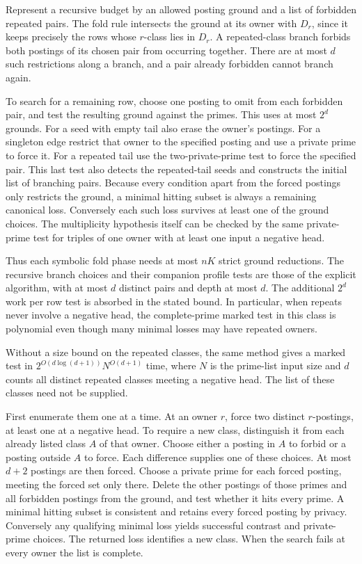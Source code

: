 Represent a recursive budget by an allowed posting
ground and a list of forbidden repeated pairs. The
fold rule intersects the ground at its owner with
$D_r$, since it keeps precisely the rows whose
$r$-class lies in $D_r$. A repeated-class branch
forbids both postings of its chosen pair from
occurring together. There are at most $d$ such
restrictions along a branch, and a pair already
forbidden cannot branch again.

To search for a remaining row, choose one posting
to omit from each forbidden pair, and test the
resulting ground against the primes. This uses
at most $2^d$ grounds. For a seed with empty tail
also erase the owner's postings. For a singleton
edge restrict that owner to the specified posting
and use a private prime to force it. For a repeated
tail use the two-private-prime test to force the
specified pair. This last test also detects the
repeated-tail seeds and constructs the initial
list of branching pairs. Because every condition
apart from the forced postings only restricts the
ground, a minimal hitting subset is always a
remaining canonical loss. Conversely each such
loss survives at least one of the ground choices.
The multiplicity hypothesis itself can be checked
by the same private-prime test for triples of one
owner with at least one input a negative head.

Thus each symbolic fold phase needs at most $nK$
strict ground reductions. The recursive branch
choices and their companion profile tests are
those of the explicit algorithm, with at most $d$
distinct pairs and depth at most $d$. The additional
$2^d$ work per row test is absorbed in the stated
bound. In particular, when repeats never involve
a negative head, the complete-prime marked test
in this class is polynomial even though many
minimal losses may have repeated owners.

Without a size bound on the repeated classes, the
same method gives a marked test in
$2^{O(d\log(d+1))}N^{O(d+1)}$ time, where $N$ is the
prime-list input size and $d$ counts all distinct
repeated classes meeting a negative head. The list
of these classes need not be supplied.

First enumerate them one at a time. At an owner $r$,
force two distinct $r$-postings, at least one at a
negative head. To require a new class, distinguish it
from each already listed class $A$ of that owner.
Choose either a posting in $A$ to forbid or a posting
outside $A$ to force. Each difference supplies one of
these choices. At most $d+2$ postings are then forced.
Choose a private prime for each forced posting,
meeting the forced set only there. Delete the other
postings of those primes and all forbidden postings
from the ground, and test whether it hits every
prime. A minimal hitting subset is consistent and
retains every forced posting by privacy. Conversely
any qualifying minimal loss yields successful
contrast and private-prime choices. The returned
loss identifies a new class. When the search fails
at every owner the list is complete.

